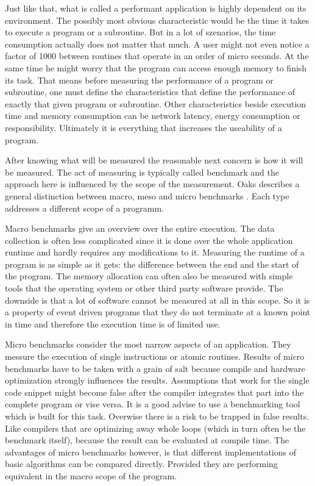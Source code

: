 Just like that, what is called a performant application is highly dependent on its environment. The possibly most obvious characteristic would be the time it takes to execute a program or a subroutine. But in a lot of szenarios, the time consumption actually does not matter that much. A user might not even notice a factor of 1000 between routines that operate in an order of micro seconds. At the same time he might worry that the program can access enough memory to finish its task. That means before measuring the performance of a program or subroutine, one must define the characteristics that define the performance of exactly that given program or subroutine. Other characteristics beside execution time and memory consumption can be network latency, energy consumption or responsibility. Ultimately it is everything that increases the useability of a program.

After knowing what will be measured the reasonable next concern is how it will be measured. The act of measuring is typically called benchmark and the approach here is influenced by the scope of the measurement. Oaks describes a general distinction between macro, meso and micro benchmarks \cite{oaks2014java}. Each type addresses a different scope of a programm.%

Macro benchmarks give an overview over the entire execution. The data collection is often less complicated since it is done over the whole application runtime and hardly requires any modifications to it. Measuring the runtime of a program is as simple as it gets: the difference between the end and the start of the program. The memory allocation can often also be measured with simple tools that the operating system or other third party software provide. The downside is that a lot of software cannot be measured at all in this scope. So it is a property of event driven programs that they do not terminate at a known point in time and therefore the execution time is of limited use.

Micro benchmarks consider the most narrow aspects of an application. They messure the execution of single instructions or atomic routines. Results of micro benchmarks have to be taken with a grain of salt because compile and hardware optimization strongly influences the results. Assumptions that work for the single code snippet might become false after the compiler integrates that part into the complete program or vise versa. It is a good advise to use a benchmarking tool which is built for this task. Overwise there is a risk to be trapped in false results. Like compilers that are optimizing away whole loops (which in turn often be the benchmark itself), because the result can be evaluated at compile time. The advantages of micro benchmarks however, is that different implementations of basic algorithms can be compared directly. Provided they are performing equivalent in the macro scope of the program.

